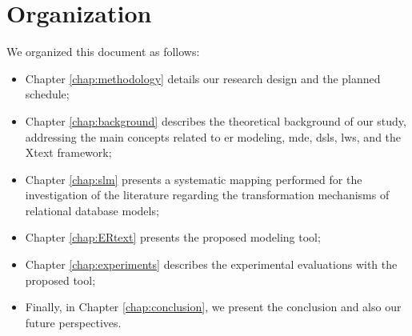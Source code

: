 \section{Organization}

We organized this document as follows:

\begin{itemize}
    \item Chapter \ref{chap:methodology} details our research design and the planned schedule;
    \item Chapter \ref{chap:background} describes the theoretical background of our study, addressing the main concepts related to \ac{er} modeling, \ac{mde}, \acp{dsl}, \acp{lw}, and the Xtext framework;
    \item Chapter \ref{chap:slm} presents a systematic mapping performed for the investigation of the literature regarding the transformation mechanisms of relational database models;
    \item Chapter \ref{chap:ERtext} presents the proposed modeling tool;
    \item Chapter \ref{chap:experiments} describes the experimental evaluations with the proposed tool;
    \item Finally, in Chapter \ref{chap:conclusion}, we present the conclusion and also our future perspectives.
\end{itemize}



